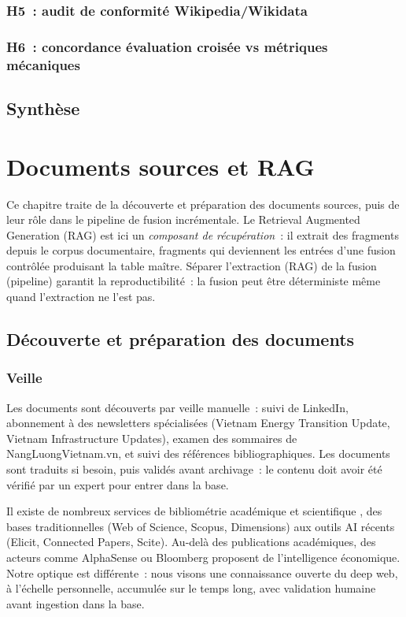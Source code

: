 \documentclass[a4paper,11pt]{report}
\begin{document}
\subsection{H5~: audit de conformité Wikipedia/Wikidata}

\subsection{H6~: concordance évaluation croisée vs métriques mécaniques}

\section{Synthèse}\label{sec:exp2-sota:synthese}

\chapter{Documents sources et RAG}\label{chap:rag}

Ce chapitre traite de la découverte et préparation des documents sources, puis de leur rôle dans le pipeline de fusion incrémentale. Le Retrieval Augmented Generation (RAG) est ici un \emph{composant de récupération}~: il extrait des fragments depuis le corpus documentaire, fragments qui deviennent les entrées d'une fusion contrôlée produisant la table maître. Séparer l'extraction (RAG) de la fusion (pipeline) garantit la reproductibilité~: la fusion peut être déterministe même quand l'extraction ne l'est pas.

\section{Découverte et préparation des documents}

\subsection{Veille}

Les documents sont découverts par veille manuelle~: suivi de LinkedIn, abonnement à des newsletters spécialisées (Vietnam Energy Transition Update, Vietnam Infrastructure Updates), examen des sommaires de NangLuongVietnam.vn, et suivi des références bibliographiques. Les documents sont traduits si besoin, puis validés avant archivage~: le contenu doit avoir été vérifié par un expert pour entrer dans la base.

Il existe de nombreux services de bibliométrie académique et scientifique \citep{5WPNTHNM}, des bases traditionnelles (Web of Science, Scopus, Dimensions) aux outils AI récents (Elicit, Connected Papers, Scite). Au-delà des publications académiques, des acteurs comme AlphaSense ou Bloomberg proposent de l'intelligence économique. Notre optique est différente~: nous visons une connaissance ouverte du deep web, à l'échelle personnelle, accumulée sur le temps long, avec validation humaine avant ingestion dans la base.
\end{document}
